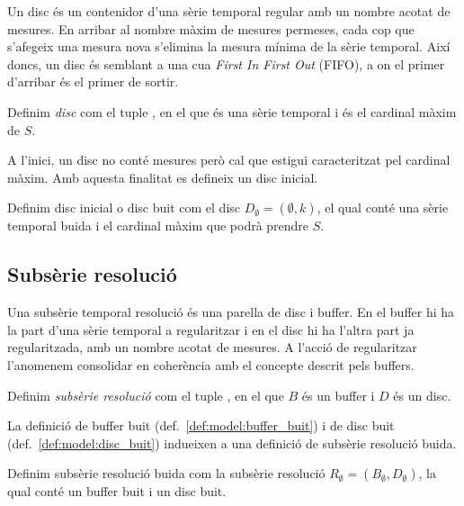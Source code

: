 Un disc és un contenidor d'una sèrie temporal regular amb un nombre
acotat de mesures. En arribar al nombre màxim de mesures permeses,
cada cop que s'afegeix una mesura nova s'elimina la mesura mínima de
la sèrie temporal.  Així doncs, un disc és semblant a una cua
\emph{First In First Out} (FIFO), a on el primer d'arribar és el
primer de sortir.

\begin{definition}[Disc]
  Definim \emph{disc} com el tuple , en
  el que  és una sèrie temporal i
   és el cardinal màxim de $S$.
\end{definition}

A l'inici, un disc no conté mesures però cal que estigui caracteritzat
pel cardinal màxim. Amb aquesta finalitat es defineix un disc inicial.

\begin{definition}\label{def:model:disc_buit}
  Definim disc inicial o disc buit com el disc $D_{\emptyset} =
  (\emptyset,k)$, el qual conté una sèrie temporal buida i el cardinal
  màxim que podrà prendre $S$.
\end{definition}




\subsection{Subsèrie resolució}\label{sec:model:subserie-resolucio}

Una subsèrie temporal resolució és una parella de disc i buffer. En el
buffer hi ha la part d'una sèrie temporal a regularitzar i en el disc
hi ha l'altra part ja regularitzada, amb un nombre acotat de
mesures. A l'acció de regularitzar l'anomenem consolidar en coherència
amb el concepte descrit pels buffers.


\begin{definition}
  Definim \emph{subsèrie resolució} com el tuple
  , en el que $B$ és un buffer i $D$
  és un disc.
\end{definition}
 
La definició de buffer buit (def.~\ref{def:model:buffer_buit}) i de
disc buit (def.~\ref{def:model:disc_buit}) indueixen a una definició
de subsèrie resolució buida.
\begin{definition}\label{def:model:subserie_resolucio_buida}
  Definim subsèrie resolució buida com la subsèrie resolució $R_{\emptyset}
  = (B_{\emptyset},D_{\emptyset})$, la qual conté un buffer buit i un
  disc buit.
\end{definition}


